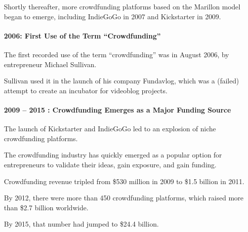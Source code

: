 Shortly thereafter, more crowdfunding platforms based on the Marillon model began to emerge, including IndieGoGo in 2007 and Kickstarter in 2009.

\paragraph*{2006: First Use of the Term “Crowdfunding”}
The first recorded use of the term “crowdfunding” was in August 2006, by entrepreneur Michael Sullivan.

Sullivan used it in the launch of his company Fundavlog, which was a (failed) attempt to create an incubator for videoblog projects.

\paragraph*{2009 – 2015 : Crowdfunding Emerges as a Major Funding Source}
The launch of Kickstarter and IndieGoGo led to an explosion of niche crowdfunding platforms.

The crowdfunding industry has quickly emerged as a popular option for entrepreneurs to validate their ideas, gain exposure, and gain funding.

Crowdfunding revenue tripled from \$530 million in 2009 to \$1.5 billion in 2011.

By 2012, there were more than 450 crowdfunding platforms, which raised more than \$2.7 billion worldwide.

By 2015, that number had jumped to \$24.4 billion.


